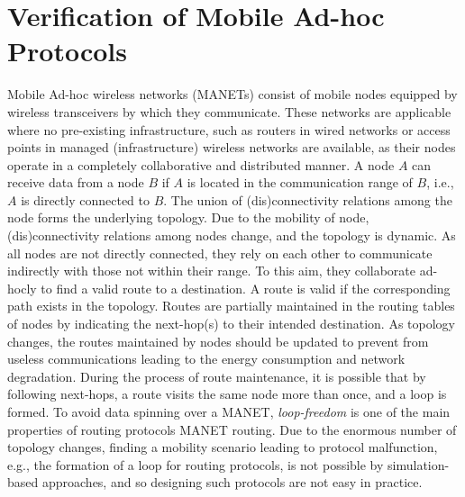 \section{Verification of Mobile Ad-hoc Protocols}\label{sec::wrebeca} 
Mobile Ad-hoc wireless networks (MANETs) consist of mobile nodes equipped by wireless transceivers by which they communicate. These networks are applicable where no pre-existing infrastructure, such as routers in wired networks or access points in managed (infrastructure) wireless networks are available, as their nodes operate in a completely collaborative and distributed manner. A node $A$ can receive data from a node $B$ if $A$ is located in the communication range of $B$, i.e., $A$ is directly connected to $B$. The union of (dis)connectivity relations among the node forms the underlying topology.  Due to the mobility of node, (dis)connectivity relations among nodes change, and the topology is dynamic. As all nodes are not directly connected, they rely on each other to communicate indirectly with those not within their range. To this aim, they collaborate ad-hocly to find a valid route to a destination. A route is valid if the corresponding path exists in the topology. Routes are partially maintained in the routing tables of nodes by indicating the next-hop(s) to their intended destination. As topology changes, the routes maintained by nodes should be updated to prevent from useless communications leading to the energy consumption and network degradation. During the process of route maintenance, it is possible that by following next-hops, a route visits the same node more than once, and a loop is formed. To avoid data spinning over a MANET, \emph{loop-freedom} is one of the main properties of routing protocols MANET routing. Due to the enormous number of topology changes, finding a mobility scenario leading to protocol malfunction, e.g., the formation of a loop for routing protocols, is not possible by simulation-based approaches, and so designing such protocols are not easy in practice. %


